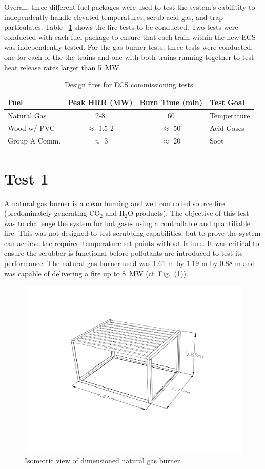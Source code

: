\documentclass[12pt,oneside]{book}
\begin{document}
Overall, three different fuel packages were used to test the system's cabilitity to independently handle elevated temperatures, scrub acid gas, and trap particulates. Table ~\ref{tab:fires} shows the fire tests to be conducted. Two tests were conducted with each fuel package to ensure that each train within the new ECS was independently tested. For the gas burner tests, three tests were conducted; one for each of the the trains and one with both trains running together to test heat release rates larger than 5~MW.

\begin{table}
\centering
\caption{Design fires for ECS commissioning tests}
\label{tab:fires}
\begin{tabular}{lccl}
\toprule[1.5pt]
Fuel & Peak HRR (MW) & Burn Time (min) & Test Goal  \\
\midrule
Natural Gas   & 2-8             & 60            & Temperature  \\
Wood w/ PVC   & $\approx$ 1.5-2 & $\approx$ 50  & Acid Gases \\
Group A Comm. & $\approx$ 3     & $\approx$ 20  & Soot \\
\bottomrule[1.25pt]
\end{tabular}\par
\end{table}


\section{Test 1}
\label{test1}
A natural gas burner is a clean burning and well controlled source fire (predominately generating CO$_2$ and H$_2$O products). The objective of this test was to challenge the system for hot gases using a controllable and quantifiable fire. This was not designed to test scrubbing capabilities, but to prove the system can achieve the required temperature set points without failure. It was critical to ensure the scrubber is functional before pollutants are introduced to test its performance. The natural gas burner used was 1.61 m by 1.19 m by 0.88 m and was capable of delivering a fire up to 8~MW (cf. Fig.~(\ref{fig:nat_gas_burn})).

\begin{figure}
\centering
\includegraphics[width=.8\textwidth]{../Figures/Natural_Gas_Burner}
\caption {Isometric view of dimensioned natural gas burner.}
\label{fig:nat_gas_burn}
\end{figure}
\end{document}
